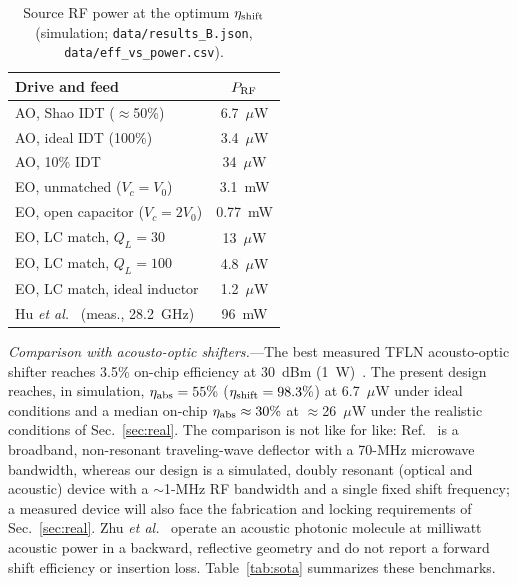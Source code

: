 \documentclass[aps,prapplied,reprint,superscriptaddress,amsmath,amssymb,floatfix]{revtex4-2}
\newcommand{\etash}{\eta_{\rm shift}}
\newcommand{\etaabs}{\eta_{\rm abs}}
\newcommand{\Pg}{P_{\rm RF}}
\begin{document}
\begin{table}[t]
\caption{Source RF power at the optimum $\etash$ (simulation; \texttt{data/results\_B.json}, \texttt{data/eff\_vs\_power.csv}).}
\label{tab:power}
\begin{ruledtabular}
\begin{tabular}{lc}
Drive and feed & $\Pg$\\
\hline
AO, Shao IDT ($\approx$50\%) & 6.7~$\mu$W\\
AO, ideal IDT (100\%) & 3.4~$\mu$W\\
AO, 10\% IDT & 34~$\mu$W\\
EO, unmatched ($V_c=V_0$) & 3.1~mW\\
EO, open capacitor ($V_c=2V_0$) & 0.77~mW\\
EO, LC match, $Q_L=30$ & 13~$\mu$W\\
EO, LC match, $Q_L=100$ & 4.8~$\mu$W\\
EO, LC match, ideal inductor & 1.2~$\mu$W\\
\hline
Hu \emph{et al.}~\cite{Hu2021} (meas., 28.2~GHz) & 96~mW\\
\end{tabular}
\end{ruledtabular}
\end{table}

\emph{Comparison with acousto-optic shifters.}---The best measured TFLN acousto-optic shifter reaches 3.5\% on-chip efficiency at 30~dBm (1~W)~\cite{Shao2020}. The present design reaches, in simulation, $\etaabs=55\%$ ($\etash=98.3\%$) at 6.7~$\mu$W under ideal conditions and a median on-chip $\etaabs\approx30\%$ at $\approx$26~$\mu$W under the realistic conditions of Sec.~\ref{sec:real}. The comparison is not like for like: Ref.~\cite{Shao2020} is a broadband, non-resonant traveling-wave deflector with a 70-MHz microwave bandwidth, whereas our design is a simulated, doubly resonant (optical and acoustic) device with a $\sim$1-MHz RF bandwidth and a single fixed shift frequency; a measured device will also face the fabrication and locking requirements of Sec.~\ref{sec:real}. Zhu \emph{et al.}~\cite{Zhu2025ao} operate an acoustic photonic molecule at milliwatt acoustic power in a backward, reflective geometry and do not report a forward shift efficiency or insertion loss. Table~\ref{tab:sota} summarizes these benchmarks.
\end{document}
